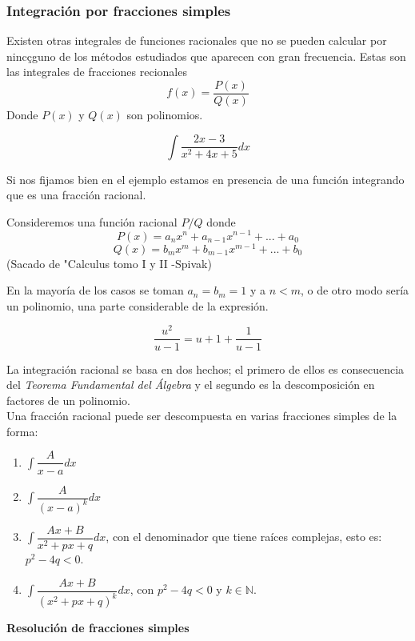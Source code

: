 \documentclass[10pt,twoside]{SelfArx} %
\begin{document}
\subsubsection{Integración por fracciones simples}
 Existen otras integrales de funciones racionales que no se pueden calcular por nincçguno de los métodos estudiados que aparecen con gran frecuencia. Estas son las integrales de fracciones recionales
 \[ f(x)=\dfrac{P(x)}{Q(x)} \]
 Donde $ P(x) $ y $ Q(x) $ son polinomios.
 \begin{ejemplo}
 	\[ \int\dfrac{2x-3}{x^{2}+4x+5}dx \]
 \end{ejemplo}
 Si nos fijamos bien en el ejemplo estamos en presencia de una función integrando que es una fracción racional.
 \begin{thm}
 	Consideremos una función racional $ P/Q $ donde
 	\[ P(x)=a_{n}x^{n}+a_{n-1}x^{n-1}+...+a_{0} \]
 	\[ Q(x)=b_{m}x^{m}+b_{m-1}x^{m-1}+...+b_{0} \]
 	(Sacado de "Calculus tomo I y II -Spivak)
 \end{thm}
 En la mayoría de los casos se toman $ a_{n}=b_{m}=1 $ y  a $ n<m $, o de otro modo ser\'ia un polinomio, una parte considerable de la expresi\'on.
 \begin{ejemplo}
 	\[ \dfrac{u^{2}}{u-1}=u+1+\dfrac{1}{u-1} \]
 \end{ejemplo}
 La integración racional se basa en dos hechos; el primero de ellos es consecuencia del \textsl{Teorema Fundamental del Álgebra}
 y el segundo es la descomposición en factores de un polinomio.
 \\
 Una fracción racional puede ser descompuesta en varias fracciones simples de la forma:
 \begin{enumerate}
 	\item $  \displaystyle\int \dfrac{A}{x-a}dx  $
 	\item  $ \displaystyle\int \dfrac{A}{(x-a)^{k}}dx  $
 	\item  $ \displaystyle\int\dfrac{Ax+B}{x^{2}+px+q}dx  $, con el denominador que tiene raíces complejas, esto es: $ p^{2}-4q<0 $.
 	\item  $ \displaystyle\int\dfrac{Ax+B}{(x^{2}+px+q)^{k}}dx  $, con $ p^{2}-4q<0 $ y $ k\in\mathbb{N} $.
 \end{enumerate}
 \textbf{Resolución de fracciones simples}\\
\end{document}
